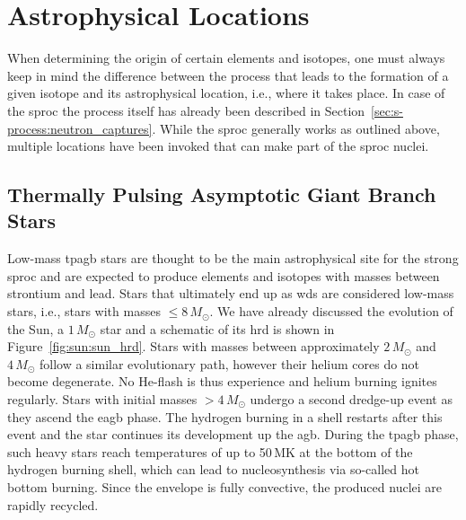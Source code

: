 \section{Astrophysical Locations}

When determining the origin of certain elements and isotopes, one must always keep in mind the difference between the process that leads to the formation of a given isotope and its astrophysical location, i.e., where it takes place. In case of the \ac{sproc} the process itself has already been described in Section~\ref{sec:s-process:neutron_captures}. While the \ac{sproc} generally works as outlined above, multiple locations have been invoked that can make part of the \ac{sproc} nuclei.

\subsection{Thermally Pulsing Asymptotic Giant Branch Stars}

Low-mass \ac{tpagb} stars are thought to be the main astrophysical site for the strong \ac{sproc} and are expected to produce elements and isotopes with masses between strontium and lead. Stars that ultimately end up as \acp{wd} are considered low-mass stars, i.e., stars with masses $\leq 8\,M_\odot$. We have already discussed the evolution of the Sun, a $1\,M_\odot$ star and a schematic of its \ac{hrd} is shown in Figure~\ref{fig:sun:sun_hrd}. 
Stars with masses between approximately $2\,M_\odot$ and $4\,M_\odot$ follow a similar evolutionary path, however their helium cores do not become degenerate. No He-flash is thus experience and helium burning ignites regularly. 
Stars with initial masses $>4\,M_\odot$ undergo a second dredge-up event as they ascend the \ac{eagb} phase. The hydrogen burning in a shell restarts after this event and the star continues its development up the \ac{agb}. During the \ac{tpagb} phase, such heavy stars reach temperatures of up to 50\,MK at the bottom of the hydrogen burning shell, which can lead to nucleosynthesis via so-called hot bottom burning. Since the envelope is fully convective, the produced nuclei are rapidly recycled. 

